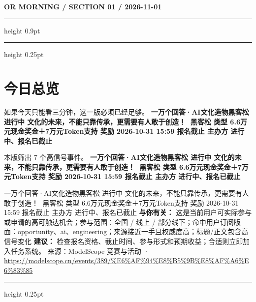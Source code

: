 \documentclass[10.5pt]{ctexart}
\begin{document}
{\small\bfseries OR MORNING / SECTION 01 / 2026-11-01}
\vspace{2mm}
\hrule height 0.9pt
\vspace{1.5mm}
\hrule height 0.25pt
\vspace{4mm}
\section*{今日总览}
{\color{ormuted} 如果今天只能看三分钟，这一版必须已经足够。}
\vspace{2mm}
{\fontsize{25}{29}\selectfont\bfseries 一万个回答·AI文化造物黑客松 进行中 文化的未来，不能只靠传承，更需要有人敢于创造！👋 黑客松 类型 6.6万元现金奖金＋7万元Token支持 奖励 2026-10-31 15:59 报名截止 主办方 进行中、报名已截止}\par
\vspace{2mm}
{\large 本版筛出 7 个高信号事件。}
\vspace{3mm}
{\Large\bfseries 一万个回答·AI文化造物黑客松 进行中 文化的未来，不能只靠传承，更需要有人敢于创造！👋 黑客松 类型 6.6万元现金奖金＋7万元Token支持 奖励 2026-10-31 15:59 报名截止 主办方 进行中、报名已截止}\par
一万个回答·AI文化造物黑客松 进行中 文化的未来，不能只靠传承，更需要有人敢于创造！👋 黑客松 类型 6.6万元现金奖金＋7万元Token支持 奖励 2026-10-31 15:59 报名截止 主办方 进行中、报名已截止
\textbf{与你有关：} 这是当前用户可实际参与或申请的高可触达机会；参与范围：全国 / 线上 / 部分线下；命中用户订阅版面：opportunity、ai、engineering；来源接近一手且权威度高；标题/正文包含高信号变化
\textbf{建议：} 检查报名资格、截止时间、参与形式和预期收益；合适则立即加入任务系统。
{\footnotesize\color{ormuted} 来源：ModelScope 竞赛与活动 · \url{https://modelscope.cn/events/389/%E6%AF%94%E8%B5%9B%E8%AF%A6%E6%83%85}}
\vspace{3mm}
\hrule height 0.25pt
\vspace{3mm}
\end{document}
